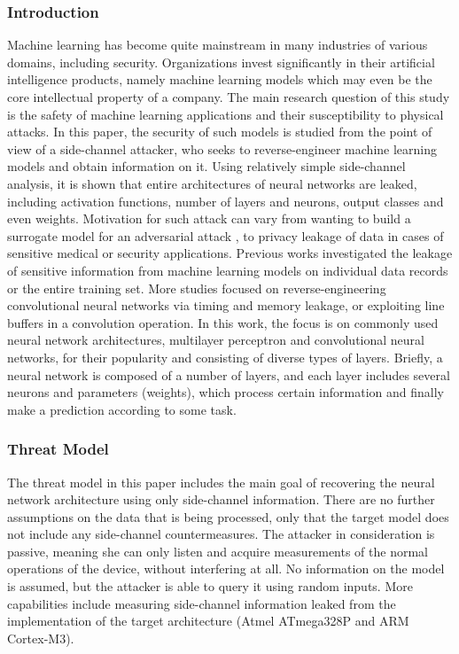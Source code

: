 \subsubsection{Introduction}
Machine learning has become quite mainstream in many industries of various domains, including security.
Organizations invest significantly in their artificial intelligence products, namely machine learning models which may even be the core intellectual property of a company.
The main research question of this study is the safety of machine learning applications and their susceptibility to physical attacks.
In this paper, the security of such models is studied from the point of view of a side-channel attacker, who seeks to reverse-engineer machine learning models and obtain information on it.
Using relatively simple side-channel analysis, it is shown that entire architectures of neural networks are leaked, including activation functions, number of layers and neurons, output classes and even weights.
Motivation for such attack can vary from wanting to build a surrogate model for an adversarial attack \cite{papernot2016transferability}, to privacy leakage of data in cases of sensitive medical or security applications.
Previous works investigated the leakage of sensitive information from machine learning models on individual data records or the entire training set.
More studies focused on reverse-engineering convolutional neural networks via timing and memory leakage, or exploiting line buffers in a convolution operation.
In this work, the focus is on commonly used neural network architectures, multilayer perceptron and convolutional neural networks, for their popularity and consisting of diverse types of layers.
Briefly, a neural network is composed of a number of layers, and each layer includes several neurons and parameters (weights), which process certain information and finally make a prediction according to some task.

\subsubsection{Threat Model}
The threat model in this paper includes the main goal of recovering the neural network architecture using only side-channel information.
There are no further assumptions on the data that is being processed, only that the target model does not include any side-channel countermeasures.
The attacker in consideration is passive, meaning she can only listen and acquire measurements of the normal operations of the device, without interfering at all.
No information on the model is assumed, but the attacker is able to query it using random inputs.
More capabilities include measuring side-channel information leaked from the implementation of the target architecture (Atmel ATmega328P and ARM Cortex-M3).

